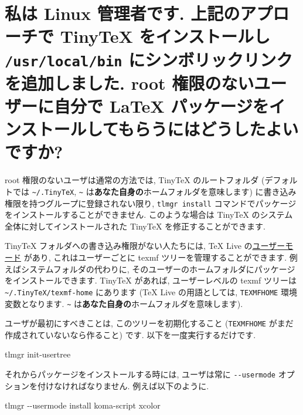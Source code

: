 \documentclass[
  xelatex,ja=standard,jafont=noto]{bxjsreport}
\newenvironment{Shaded}{\begin{snugshade}}{\end{snugshade}}
\newcommand{\AttributeTok}[1]{\textcolor[rgb]{0.77,0.63,0.00}{#1}}
\newcommand{\ExtensionTok}[1]{#1}
\newcommand{\NormalTok}[1]{#1}
\begin{document}
\hypertarget{non-root-package-installation}{%
\section{\texorpdfstring{私は Linux 管理者です. 上記のアプローチで
TinyTeX をインストールし \texttt{/usr/local/bin}
にシンボリックリンクを追加しました. root 権限のないユーザーに自分で
LaTeX
パッケージをインストールしてもらうにはどうしたよいですか?}{私は Linux 管理者です. 上記のアプローチで TinyTeX をインストールし /usr/local/bin にシンボリックリンクを追加しました. root 権限のないユーザーに自分で LaTeX パッケージをインストールしてもらうにはどうしたよいですか?}}\label{non-root-package-installation}}

root 権限のないユーザは通常の方法では, TinyTeX のルートフォルダ
(デフォルトでは \texttt{\textasciitilde{}/.TinyTeX},
\texttt{\textasciitilde{}}
は\textbf{あなた自身の}ホームフォルダを意味します)
に書き込み権限を持つグループに登録されない限り, \texttt{tlmgr\ install}
コマンドでパッケージをインストールすることができません. このような場合は
TinyTeX のシステム全体に対してインストールされた TinyTeX
を修正することができます.

TinyTeX フォルダへの書き込み権限がない人たちには, TeX Live
の\href{https://www.tug.org/texlive/doc/tlmgr.html\#USER-MODE}{ユーザーモード}
があり, これはユーザーごとに texmf ツリーを管理することができます.
例えばシステムフォルダの代わりに,
そのユーザーのホームフォルダにパッケージをインストールできます. TinyTeX
があれば, ユーザーレベルの texmf ツリーは
\texttt{\textasciitilde{}/.TinyTeX/texmf-home} にあります (TeX Live
の用語としては, \texttt{TEXMFHOME} 環境変数となります.
\texttt{\textasciitilde{}}
は\textbf{あなた自身の}ホームフォルダを意味します).

ユーザが最初にすべきことは, このツリーを初期化すること
(\texttt{TEXMFHOME} がまだ作成されていないなら作ること) です.
以下を一度実行するだけです.

\begin{Shaded}
\begin{Highlighting}[]
\ExtensionTok{tlmgr}\NormalTok{ init{-}usertree}
\end{Highlighting}
\end{Shaded}

それからパッケージをインストールする時には, ユーザは常に
\texttt{-\/-usermode} オプションを付けなければなりません.
例えば以下のように.

\begin{Shaded}
\begin{Highlighting}[]
\ExtensionTok{tlmgr} \AttributeTok{{-}{-}usermode}\NormalTok{ install koma{-}script xcolor}
\end{Highlighting}
\end{Shaded}
\end{document}
